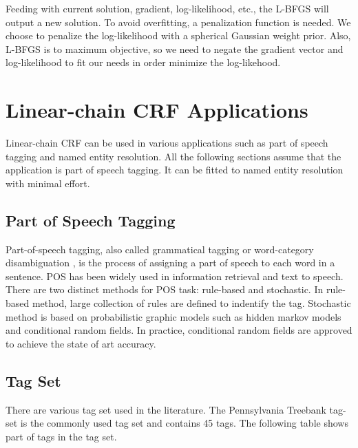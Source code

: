 Feeding with current solution, gradient, log-likelihood, etc., the L-BFGS will output a new solution.
To avoid overfitting, a penalization function is needed. We choose to penalize the log-likelihood with a spherical Gaussian weight prior.
Also, L-BFGS is to maximum objective, so we need to negate the gradient vector and log-likelihood to fit our needs in order minimize the log-likehood.

\section{Linear-chain CRF Applications}
Linear-chain CRF can be used in various applications such as  part of speech tagging and named entity resolution.
All the following sections assume that the application is part of speech tagging. It can be fitted to named entity resolution with minimal effort.

\subsection{Part of Speech Tagging}
Part-of-speech tagging, also called grammatical tagging or word-category disambiguation \cite{DBLP:journals/coling/DeRose88}, is the process of assigning
a part of speech to each word in a sentence. POS has been widely used in information retrieval and text to speech. There are two distinct methods for
POS task: rule-based and stochastic.
In rule-based method, large collection of rules are defined to indentify the tag. Stochastic method is based on probabilistic
graphic models such as hidden markov models and conditional random fields. In practice, conditional random fields are approved
to achieve the state of art accuracy.
\subsection{Tag Set}
There are various tag set used in the literature. The Pennsylvania Treebank tag-set \cite{DBLP:journals/coling/MarcusSM94} is the commonly used tag set and contains
45 tags. The following table shows part of tags in the tag set.

